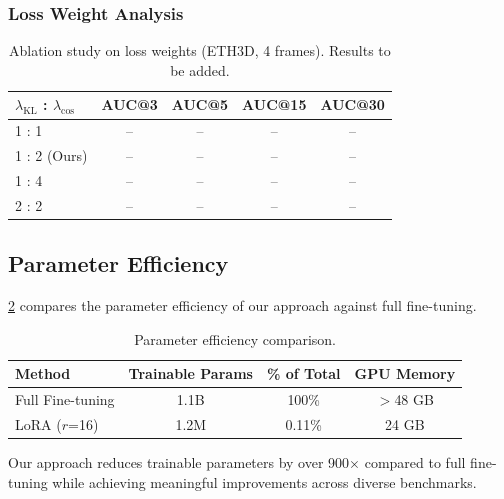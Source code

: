 \subsubsection{Loss Weight Analysis}

\begin{table}[t]
\centering
\caption{Ablation study on loss weights (ETH3D, 4 frames). Results to be added.}
\label{tab:ablation_weights}
\setlength{\tabcolsep}{5pt}
\begin{tabular}{@{}l c c c c@{}}
\toprule
$\lambda_{\text{KL}}$ : $\lambda_{\text{cos}}$ & AUC@3 & AUC@5 & AUC@15 & AUC@30 \\
\midrule
1 : 1 & -- & -- & -- & -- \\
1 : 2 (Ours) & -- & -- & -- & -- \\
1 : 4 & -- & -- & -- & -- \\
2 : 2 & -- & -- & -- & -- \\
\bottomrule
\end{tabular}
\end{table}

\subsection{Parameter Efficiency}

\cref{tab:efficiency} compares the parameter efficiency of our approach against full fine-tuning.

\begin{table}[t]
\centering
\caption{Parameter efficiency comparison.}
\label{tab:efficiency}
\begin{tabular}{@{}l c c c@{}}
\toprule
Method & Trainable Params & \% of Total & GPU Memory \\
\midrule
Full Fine-tuning & 1.1B & 100\% & $>$48 GB \\
LoRA ($r$=16) & 1.2M & 0.11\% & 24 GB \\
\bottomrule
\end{tabular}
\end{table}

Our approach reduces trainable parameters by over 900$\times$ compared to full fine-tuning while achieving meaningful improvements across diverse benchmarks.
